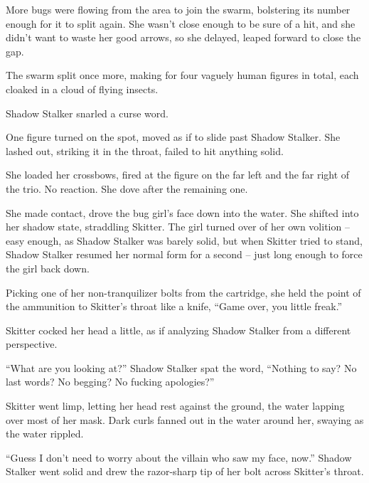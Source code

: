More bugs were flowing from the area to join the swarm, bolstering its number enough for it to split again.  She wasn't close enough to be sure of a hit, and she didn't want to waste her good arrows, so she delayed, leaped forward to close the gap.



The swarm split once more, making for four vaguely human figures in total, each cloaked in a cloud of flying insects.



Shadow Stalker snarled a curse word.



One figure turned on the spot, moved as if to slide past Shadow Stalker.  She lashed out, striking it in the throat, failed to hit anything solid.



She loaded her crossbows, fired at the figure on the far left and the far right of the trio.  No reaction.  She dove after the remaining one.



She made contact, drove the bug girl's face down into the water.  She shifted into her shadow state, straddling Skitter.   The girl turned over of her own volition – easy enough, as Shadow Stalker was barely solid, but when Skitter tried to stand, Shadow Stalker resumed her normal form for a second – just long enough to force the girl back down.



Picking one of her non-tranquilizer bolts from the cartridge, she held the point of the ammunition to Skitter's throat like a knife, ``Game over, you little freak.''



Skitter cocked her head a little, as if analyzing Shadow Stalker from a different perspective.



``What are you looking at?'' Shadow Stalker spat the word, ``Nothing to say?  No last words?  No begging?  No fucking apologies?''



Skitter went limp, letting her head rest against the ground, the water lapping over most of her mask.  Dark curls fanned out in the water around her, swaying as the water rippled.



``Guess I don't need to worry about the villain who saw my face, now.''  Shadow Stalker went solid and drew the razor-sharp tip of her bolt across Skitter's throat.



